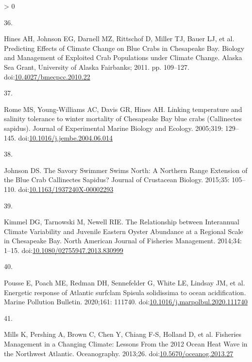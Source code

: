\documentclass[
  10pt,
]{article}
\newlength{\cslhangindent}
\newlength{\csllabelwidth}
\newenvironment{CSLReferences}[2] %
 {%
  \setlength{\parindent}{0pt}
  \ifodd #1 \everypar{\setlength{\hangindent}{\cslhangindent}}\ignorespaces\fi
  \ifnum #2 > 0
  \setlength{\parskip}{#2\baselineskip}
  \fi
 }%
 {}
\newcommand{\CSLLeftMargin}[1]{\parbox[t]{\csllabelwidth}{#1}}
\newcommand{\CSLRightInline}[1]{\parbox[t]{\linewidth - \csllabelwidth}{#1}\break}
\begin{document}
\begin{CSLReferences}{0}{0}
\leavevmode\hypertarget{ref-hines_predicting_2011}{}%
\CSLLeftMargin{36. }
\CSLRightInline{Hines AH, Johnson EG, Darnell MZ, Rittschof D, Miller
TJ, Bauer LJ, et al. Predicting {Effects} of {Climate} {Change} on
{Blue} {Crabs} in {Chesapeake} {Bay}. Biology and {Management} of
{Exploited} {Crab} {Populations} under {Climate} {Change}. Alaska Sea
Grant, University of Alaska Fairbanks; 2011. pp. 109--127.
doi:\href{https://doi.org/10.4027/bmecpcc.2010.22}{10.4027/bmecpcc.2010.22}}

\leavevmode\hypertarget{ref-rome_linking_2005}{}%
\CSLLeftMargin{37. }
\CSLRightInline{Rome MS, Young-Williams AC, Davis GR, Hines AH. Linking
temperature and salinity tolerance to winter mortality of {Chesapeake}
{Bay} blue crabs ({Callinectes} sapidus). Journal of Experimental Marine
Biology and Ecology. 2005;319: 129--145.
doi:\href{https://doi.org/10.1016/j.jembe.2004.06.014}{10.1016/j.jembe.2004.06.014}}

\leavevmode\hypertarget{ref-johnson_savory_2015}{}%
\CSLLeftMargin{38. }
\CSLRightInline{Johnson DS. The {Savory} {Swimmer} {Swims} {North}: {A}
{Northern} {Range} {Extension} of the {Blue} {Crab} {Callinectes}
{Sapidus}? Journal of Crustacean Biology. 2015;35: 105--110.
doi:\href{https://doi.org/10.1163/1937240X-00002293}{10.1163/1937240X-00002293}}

\leavevmode\hypertarget{ref-kimmel_relationship_2014}{}%
\CSLLeftMargin{39. }
\CSLRightInline{Kimmel DG, Tarnowski M, Newell RIE. The {Relationship}
between {Interannual} {Climate} {Variability} and {Juvenile} {Eastern}
{Oyster} {Abundance} at a {Regional} {Scale} in {Chesapeake} {Bay}.
North American Journal of Fisheries Management. 2014;34: 1--15.
doi:\href{https://doi.org/10.1080/02755947.2013.830999}{10.1080/02755947.2013.830999}}

\leavevmode\hypertarget{ref-pousse_energetic_2020}{}%
\CSLLeftMargin{40. }
\CSLRightInline{Pousse E, Poach ME, Redman DH, Sennefelder G, White LE,
Lindsay JM, et al. Energetic response of {Atlantic} surfclam {Spisula}
solidissima to ocean acidification. Marine Pollution Bulletin. 2020;161:
111740.
doi:\href{https://doi.org/10.1016/j.marpolbul.2020.111740}{10.1016/j.marpolbul.2020.111740}}

\leavevmode\hypertarget{ref-mills_fisheries_2013}{}%
\CSLLeftMargin{41. }
\CSLRightInline{Mills K, Pershing A, Brown C, Chen Y, Chiang F-S,
Holland D, et al. Fisheries {Management} in a {Changing} {Climate}:
{Lessons} {From} the 2012 {Ocean} {Heat} {Wave} in the {Northwest}
{Atlantic}. Oceanography. 2013;26.
doi:\href{https://doi.org/10.5670/oceanog.2013.27}{10.5670/oceanog.2013.27}}


\end{CSLReferences}
\end{document}
